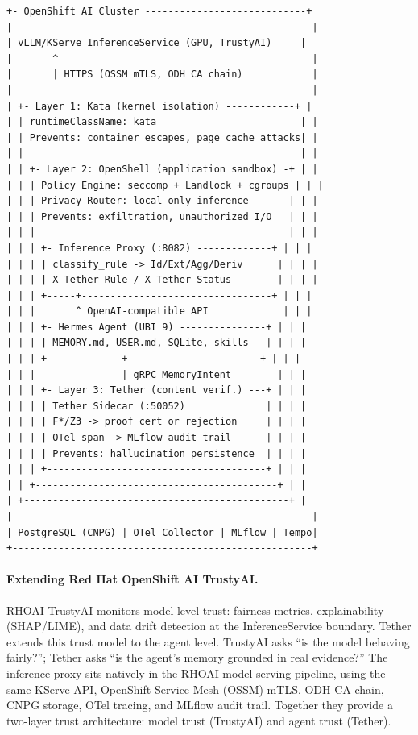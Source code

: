 \documentclass[sigplan,screen,nonacm]{acmart}
\begin{document}
\begin{lstlisting}[language={},caption={Three-layer sandboxing architecture on OpenShift AI.},label={lst:arch}]
+- OpenShift AI Cluster ----------------------------+
|                                                    |
| vLLM/KServe InferenceService (GPU, TrustyAI)     |
|       ^                                            |
|       | HTTPS (OSSM mTLS, ODH CA chain)            |
|                                                    |
| +- Layer 1: Kata (kernel isolation) ------------+ |
| | runtimeClassName: kata                         | |
| | Prevents: container escapes, page cache attacks| |
| |                                                | |
| | +- Layer 2: OpenShell (application sandbox) -+ | |
| | | Policy Engine: seccomp + Landlock + cgroups | | |
| | | Privacy Router: local-only inference       | | |
| | | Prevents: exfiltration, unauthorized I/O   | | |
| | |                                            | | |
| | | +- Inference Proxy (:8082) -------------+ | | |
| | | | classify_rule -> Id/Ext/Agg/Deriv      | | | |
| | | | X-Tether-Rule / X-Tether-Status        | | | |
| | | +-----+---------------------------------+ | | |
| | |       ^ OpenAI-compatible API             | | |
| | | +- Hermes Agent (UBI 9) ---------------+ | | |
| | | | MEMORY.md, USER.md, SQLite, skills   | | | |
| | | +-------------+-----------------------+ | | |
| | |               | gRPC MemoryIntent        | | |
| | | +- Layer 3: Tether (content verif.) ---+ | | |
| | | | Tether Sidecar (:50052)              | | | |
| | | | F*/Z3 -> proof cert or rejection     | | | |
| | | | OTel span -> MLflow audit trail      | | | |
| | | | Prevents: hallucination persistence  | | | |
| | | +--------------------------------------+ | | |
| | +------------------------------------------+ | |
| +----------------------------------------------+ |
|                                                    |
| PostgreSQL (CNPG) | OTel Collector | MLflow | Tempo|
+----------------------------------------------------+
\end{lstlisting}

\paragraph{Extending Red Hat OpenShift AI TrustyAI.}
RHOAI TrustyAI monitors model-level trust: fairness metrics, explainability
(SHAP/LIME), and data drift detection at the InferenceService boundary.
Tether extends this trust model to the agent level. TrustyAI asks ``is the
model behaving fairly?''; Tether asks ``is the agent's memory grounded in
real evidence?'' The inference proxy sits natively in the RHOAI model serving
pipeline, using the same KServe API, OpenShift Service Mesh (OSSM) mTLS,
ODH CA chain, CNPG storage, OTel tracing, and MLflow audit trail. Together
they provide a two-layer trust architecture: model trust (TrustyAI) and
agent trust (Tether).
\end{document}
